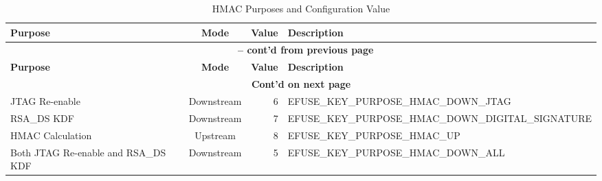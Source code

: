 \begin{longtable}[c]{|p{3.5cm}|c|r|p{9.5cm}|}
\caption{HMAC Purposes and Configuration Value}
\label{tab:hmac-key-purpose}
\\    \hline
    \rowcolor{lightgray}
    \textbf{Purpose} & \textbf{Mode} & \textbf{Value} & \textbf{Description}\\
    \hline
    \endfirsthead
    \multicolumn{4}{c}{\bfseries \tablename\ \thetable{} -- cont'd from previous page}\\\hline
    
    \rowcolor{lightgray}
    \textbf{Purpose} & \textbf{Mode} & \textbf{Value} & \textbf{Description}\\
    \hline
    \endhead
    \multicolumn{4}{c}{\textbf{Cont'd on next page}}\\
    \endfoot
    \endlastfoot

    \hline
    JTAG Re-enable & Downstream & 6 & EFUSE\_KEY\_PURPOSE\_HMAC\_DOWN\_JTAG \\
    \hline
    RSA\_DS KDF & Downstream & 7 & EFUSE\_KEY\_PURPOSE\_HMAC\_DOWN\_DIGITAL\_SIGNATURE \\
    \hline
    HMAC Calculation  & Upstream & 8 & EFUSE\_KEY\_PURPOSE\_HMAC\_UP \\    
    \hline
    Both JTAG Re-enable and RSA\_DS KDF & Downstream & 5 & EFUSE\_KEY\_PURPOSE\_HMAC\_DOWN\_ALL \\
    \hline
\end{longtable}
